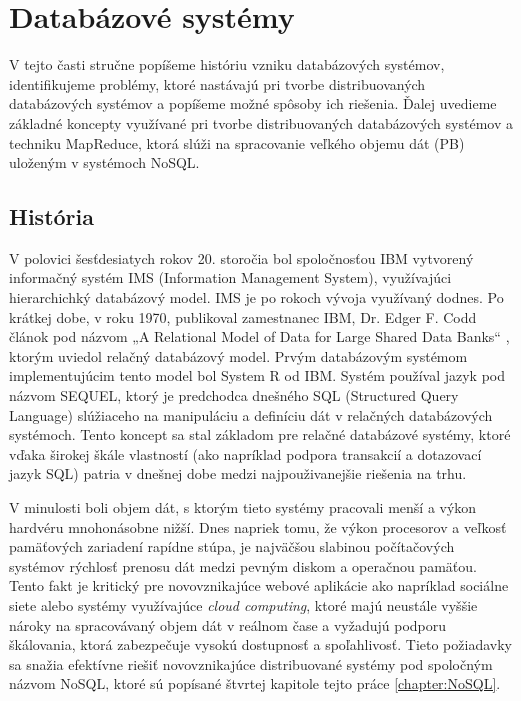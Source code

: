 \documentclass[11pt,twoside,a4paper]{book}
\begin{document}
\chapter{Databázové systémy}

V tejto časti stručne popíšeme históriu vzniku databázových systémov, identifikujeme problémy, ktoré nastávajú pri tvorbe distribuovaných databázových systémov a popíšeme možné spôsoby ich riešenia. Ďalej uvedieme základné koncepty využívané pri tvorbe distribuovaných databázových systémov a techniku MapReduce, ktorá slúži na spracovanie veľkého objemu dát (PB) uloženým v systémoch NoSQL.

\section{História}

V polovici šesťdesiatych rokov 20. storočia bol spoločnosťou IBM vytvorený informačný systém IMS (Information Management System), využívajúci hierarchichký databázový model. IMS je po rokoch vývoja využívaný dodnes. Po krátkej dobe, v roku 1970, publikoval zamestnanec IBM, Dr. Edger F. Codd článok pod názvom „A Relational Model of Data for Large Shared Data Banks“ \cite{Codd:1970:RMD:362384.362685}, ktorým uviedol relačný databázový model. Prvým databázovým systémom implementujúcim tento model bol System R od IBM. Systém používal jazyk pod názvom SEQUEL, ktorý je predchodca dnešného SQL (Structured Query Language) slúžiaceho na manipuláciu a definíciu dát v relačných databázových systémoch. Tento koncept sa stal základom pre relačné databázové systémy, ktoré vďaka širokej škále vlastností (ako napríklad podpora transakcií a dotazovací jazyk SQL) patria v dnešnej  dobe medzi najpouživanejšie riešenia na trhu.

V minulosti boli objem dát, s ktorým tieto systémy pracovali menší a výkon hardvéru mnohonásobne nižší. Dnes napriek tomu, že výkon procesorov a veľkosť pamäťových zariadení rapídne stúpa, je najväčšou slabinou počítačových systémov rýchlosť prenosu dát medzi pevným diskom a operačnou pamäťou. Tento fakt je kritický pre novovznikajúce webové aplikácie ako napríklad sociálne siete alebo systémy využívajúce \emph{cloud computing}, ktoré majú neustále vyššie nároky na spracovávaný objem dát v reálnom čase a vyžadujú podporu škálovania, ktorá zabezpečuje vysokú dostupnosť a spoľahlivosť. Tieto požiadavky sa snažia efektívne riešiť novovznikajúce distribuované systémy pod spoločným názvom NoSQL, ktoré sú popísané štvrtej kapitole tejto práce \ref{chapter:NoSQL}. 
\end{document}
